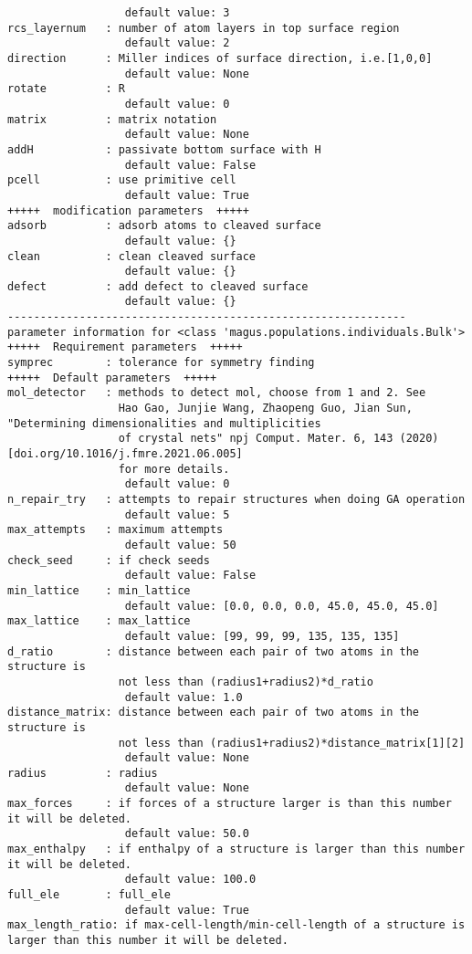 \documentclass[12pt,oneside]{book}
\begin{document}
\begin{tcolorbox}
\begin{verbatim}
                  default value: 3
rcs_layernum   : number of atom layers in top surface region
                  default value: 2
direction      : Miller indices of surface direction, i.e.[1,0,0]
                  default value: None
rotate         : R
                  default value: 0
matrix         : matrix notation
                  default value: None
addH           : passivate bottom surface with H
                  default value: False
pcell          : use primitive cell
                  default value: True
+++++  modification parameters  +++++
adsorb         : adsorb atoms to cleaved surface
                  default value: {}
clean          : clean cleaved surface
                  default value: {}
defect         : add defect to cleaved surface
                  default value: {}
-------------------------------------------------------------
parameter information for <class 'magus.populations.individuals.Bulk'>
+++++  Requirement parameters  +++++
symprec        : tolerance for symmetry finding
+++++  Default parameters  +++++
mol_detector   : methods to detect mol, choose from 1 and 2. See
                 Hao Gao, Junjie Wang, Zhaopeng Guo, Jian Sun, "Determining dimensionalities and multiplicities
                 of crystal nets" npj Comput. Mater. 6, 143 (2020) [doi.org/10.1016/j.fmre.2021.06.005]
                 for more details.
                  default value: 0
n_repair_try   : attempts to repair structures when doing GA operation
                  default value: 5
max_attempts   : maximum attempts
                  default value: 50
check_seed     : if check seeds
                  default value: False
min_lattice    : min_lattice
                  default value: [0.0, 0.0, 0.0, 45.0, 45.0, 45.0]
max_lattice    : max_lattice
                  default value: [99, 99, 99, 135, 135, 135]
d_ratio        : distance between each pair of two atoms in the structure is
                 not less than (radius1+radius2)*d_ratio
                  default value: 1.0
distance_matrix: distance between each pair of two atoms in the structure is
                 not less than (radius1+radius2)*distance_matrix[1][2]
                  default value: None
radius         : radius
                  default value: None
max_forces     : if forces of a structure larger is than this number it will be deleted.
                  default value: 50.0
max_enthalpy   : if enthalpy of a structure is larger than this number it will be deleted.
                  default value: 100.0
full_ele       : full_ele
                  default value: True
max_length_ratio: if max-cell-length/min-cell-length of a structure is larger than this number it will be deleted.

\end{verbatim}
\end{tcolorbox}
\end{document}
